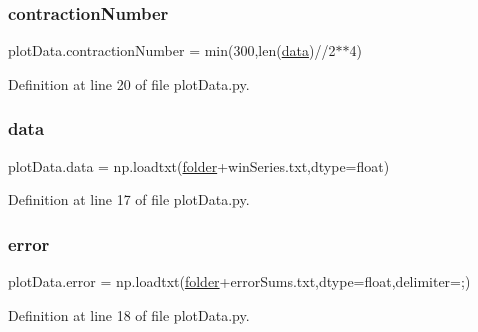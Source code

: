 \mbox{\label{namespaceplot_data_af459551cfb398cc731a4c51c4d44df41}} 
\subsubsection{\texorpdfstring{contraction\+Number}{contractionNumber}}
{\footnotesize\ttfamily plot\+Data.\+contraction\+Number = min(300,len(\hyperlink{namespaceplot_data_a44c9f3af3147f385257597dd63d09e3a}{data})//2$\ast$$\ast$4)}



Definition at line 20 of file plot\+Data.\+py.

\mbox{\label{namespaceplot_data_a44c9f3af3147f385257597dd63d09e3a}} 
\subsubsection{\texorpdfstring{data}{data}}
{\footnotesize\ttfamily plot\+Data.\+data = np.\+loadtxt(\hyperlink{namespaceplot_data_acefbb49a026077f724500d7c511fb59e}{folder}+\textquotesingle{}win\+Series.\+txt\textquotesingle{},dtype=float)}



Definition at line 17 of file plot\+Data.\+py.

\mbox{\label{namespaceplot_data_a654ab80d46bf5af451e1ca85b1dcb573}} 
\subsubsection{\texorpdfstring{error}{error}}
{\footnotesize\ttfamily plot\+Data.\+error = np.\+loadtxt(\hyperlink{namespaceplot_data_acefbb49a026077f724500d7c511fb59e}{folder}+\textquotesingle{}error\+Sums.\+txt\textquotesingle{},dtype=float,delimiter=\textquotesingle{};\textquotesingle{})}



Definition at line 18 of file plot\+Data.\+py.

\mbox{\label{namespaceplot_data_acefbb49a026077f724500d7c511fb59e}} 
